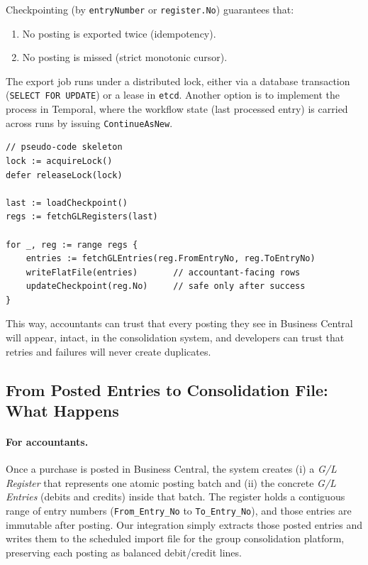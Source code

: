 \documentclass[a4paper,10pt]{article}
\begin{document}
Checkpointing (by \texttt{entryNumber} or \texttt{register.No}) guarantees that:
\begin{enumerate}
  \item No posting is exported twice (idempotency).
  \item No posting is missed (strict monotonic cursor).
\end{enumerate}

The export job runs under a distributed lock, either via a database transaction (\texttt{SELECT FOR UPDATE}) or a lease in \texttt{etcd}. Another option is to implement the process in Temporal, where the workflow state (last processed entry) is carried across runs by issuing \texttt{ContinueAsNew}.

\begin{verbatim}
// pseudo-code skeleton
lock := acquireLock()
defer releaseLock(lock)

last := loadCheckpoint()
regs := fetchGLRegisters(last)

for _, reg := range regs {
    entries := fetchGLEntries(reg.FromEntryNo, reg.ToEntryNo)
    writeFlatFile(entries)       // accountant-facing rows
    updateCheckpoint(reg.No)     // safe only after success
}
\end{verbatim}

This way, accountants can trust that every posting they see in Business Central will appear, intact, in the consolidation system, and developers can trust that retries and failures will never create duplicates.

\newpage

\subsection{From Posted Entries to Consolidation File: What Happens}

\paragraph{For accountants.}
Once a purchase is posted in Business Central, the system creates (i) a \emph{G/L Register} that represents one atomic posting batch and (ii) the concrete \emph{G/L Entries} (debits and credits) inside that batch. The register holds a contiguous range of entry numbers (\texttt{From\_Entry\_No} to \texttt{To\_Entry\_No}), and those entries are immutable after posting. Our integration simply extracts those posted entries and writes them to the scheduled import file for the group consolidation platform, preserving each posting as balanced debit/credit lines.
\end{document}

